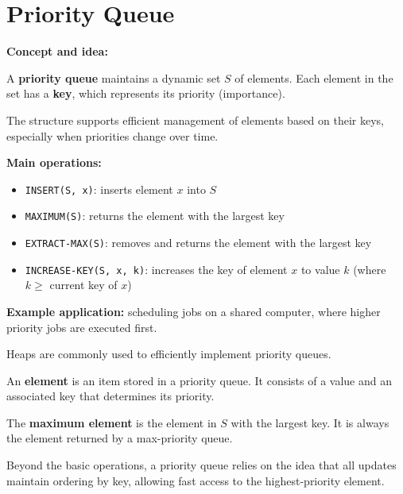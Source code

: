 \documentclass[11pt,a4paper,openany]{book}
\begin{document}
\vspace{2cm}





\chapter{Priority Queue}


\textbf{Concept and idea:}

A \textbf{priority queue} maintains a dynamic set $S$ of elements.  
Each element in the set has a \textbf{key}, which represents its priority (importance).

The structure supports efficient management of elements based on their keys, especially when priorities change over time.

\textbf{Main operations:}
\begin{itemize}
    \item \texttt{INSERT(S, x)}: inserts element $x$ into $S$
    \item \texttt{MAXIMUM(S)}: returns the element with the largest key
    \item \texttt{EXTRACT-MAX(S)}: removes and returns the element with the largest key
    \item \texttt{INCREASE-KEY(S, x, k)}: increases the key of element $x$ to value $k$ (where $k \geq$ current key of $x$)
\end{itemize}

\textbf{Example application:} scheduling jobs on a shared computer, where higher priority jobs are executed first.

Heaps are commonly used to efficiently implement priority queues.

\begin{defnbox}[title=Element]
An \textbf{element} is an item stored in a priority queue. It consists of a value and an associated key that determines its priority.
\end{defnbox}

\begin{defnbox}[title=Maximum element]
The \textbf{maximum element} is the element in $S$ with the largest key.  
It is always the element returned by a max-priority queue.
\end{defnbox}

\begin{defnbox}[title=Priority queue operations]
Beyond the basic operations, a priority queue relies on the idea that all updates maintain ordering by key, allowing fast access to the highest-priority element.
\end{defnbox}
\end{document}
